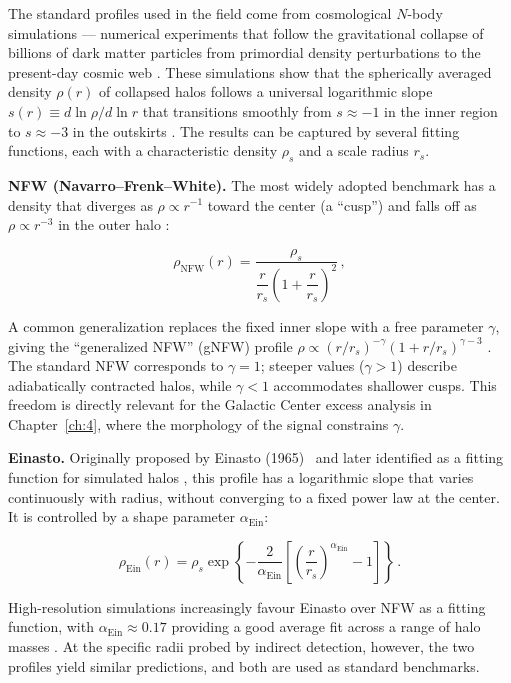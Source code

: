 The standard profiles used in the field come from cosmological $N$-body simulations --- numerical experiments that follow the gravitational collapse of billions of dark matter particles from primordial density perturbations to the present-day cosmic web \cite{Cirelli:2024ssz}.
These simulations show that the spherically averaged density $\rho(r)$ of collapsed halos follows a universal logarithmic slope $s(r) \equiv d\ln\rho / d\ln r$ that transitions smoothly from $s \approx -1$ in the inner region to $s \approx -3$ in the outskirts \cite{Cirelli:2024ssz}.
The results can be captured by several fitting functions, each with a characteristic density $\rho_s$ and a scale radius $r_s$.

\textbf{NFW (Navarro--Frenk--White).}
The most widely adopted benchmark has a density that diverges as $\rho \propto r^{-1}$ toward the center (a ``cusp'') and falls off as $\rho \propto r^{-3}$ in the outer halo \cite{Navarro:1996gj}:

\begin{equation}
	\rho_\text{NFW}(r) = \frac{\rho_s}{\dfrac{r}{r_s}\left(1 + \dfrac{r}{r_s}\right)^2} \,,
	\label{eq:nfw}
\end{equation}

A common generalization replaces the fixed inner slope with a free parameter $\gamma$, giving the ``generalized NFW'' (gNFW) profile $\rho \propto (r/r_s)^{-\gamma}(1 + r/r_s)^{\gamma - 3}$ \cite{Cirelli:2024ssz}.
The standard NFW corresponds to $\gamma = 1$; steeper values ($\gamma > 1$) describe adiabatically contracted halos, while $\gamma < 1$ accommodates shallower cusps.
This freedom is directly relevant for the Galactic Center excess analysis in Chapter~\ref{ch:4}, where the morphology of the signal constrains $\gamma$.

\textbf{Einasto.}
Originally proposed by Einasto (1965)~\cite{einasto1965construction} and later identified as a fitting function for simulated halos \cite{Cirelli:2024ssz}, this profile has a logarithmic slope that varies continuously with radius, without converging to a fixed power law at the center.
It is controlled by a shape parameter $\alpha_\text{Ein}$:

\begin{equation}
	\rho_\text{Ein}(r) = \rho_s \exp\left\{ -\frac{2}{\alpha_\text{Ein}} \left[\left(\frac{r}{r_s}\right)^{\alpha_\text{Ein}} - 1\right]\right\} \,.
	\label{eq:einasto}
\end{equation}

High-resolution simulations increasingly favour Einasto over NFW as a fitting function, with $\alpha_\text{Ein} \approx 0.17$ providing a good average fit across a range of halo masses \cite{Cirelli:2024ssz}.
At the specific radii probed by indirect detection, however, the two profiles yield similar predictions, and both are used as standard benchmarks.

